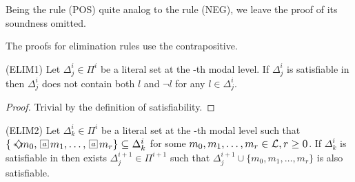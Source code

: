 Being the rule (POS) quite analog to the rule (NEG), we leave the proof of its
soundness omitted.

The proofs for elimination rules use the contrapositive.

\begin{lemma}{(ELIM1)} Let $\Delta^i_j \in \Pi^i$ be a literal set at the \ml-th
    modal level. If $\Delta^i_j$ is satisfiable in  then
    $\Delta^i_j$ does not contain both $l$ and $\neg l$ for any $l \in
    \Delta^i_j$.
\end{lemma}
\begin{proof}
    Trivial by the definition of satisfiability.
\end{proof}

\begin{lemma}{(ELIM2)} Let $\Delta^i_k \in \Pi^i$ be a literal set at the \ml-th
    modal level such that $\{\pos{a} m_0, \nec{a} m_1, \ldots, \nec{a} m_r\}
    \subseteq \Delta^i_k$ for some $m_0, m_1, \ldots, m_r \in \Literals, r \geq 0$.
    If $\Delta^i_k$ is satisfiable in  then exists
    $\Delta^{i+1}_j \in \Pi^{i+1}$ such that $\Delta^{i+1}_j \cup \{m_0, m_1,
    \ldots, m_r\}$ is also satisfiable.
\end{lemma}
